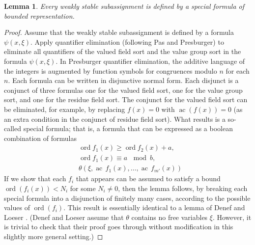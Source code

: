 \documentclass[11pt]{amsart}
\newtheorem{lemma}[theorem]{Lemma}
\theoremstyle{definition}
\theoremstyle{remark}
\numberwithin{equation}{theorem}
\def\op#1{\operatorname{#1}}
\begin{document}
\begin{lemma}  Every weakly stable subassignment is defined by a
special formula of bounded representation.
\end{lemma}

\begin{proof}  Assume that the weakly stable subassignment is
defined by a formula $\psi(x,\xi)$.  Apply quantifier elimination
(following Pas and Presburger) to eliminate all quantifiers of the
valued field sort and the value group sort in the formula
$\psi(x,\xi)$.  In Presburger quantifier elimination, the additive
language of the integers is augmented by function symbols for
congruences modulo $n$ for each $n$.  Each formula can be written
in disjunctive normal form.  Each disjunct is a conjunct of three
formulas one for the valued field sort, one for the value group
sort, and one for the residue field sort.   The conjunct for the
valued field sort can be eliminated, for example, by replacing
$f(x)=0$ with $\op{ac}(f(x))=0$ (as an extra condition in the
conjunct of residue field sort).  What results is a so-called
special formula; that is, a formula that can be expressed as a
boolean combination of formulas
    \begin{equation}
    \begin{array}{lll}
   &\op{ord} f_1(x) \ge \op{ord} f_2 (x) + a,\\
   &\op{ord} f_1(x) \equiv a \, \mod b,\\
   &\theta(\xi,\op{ac}\,f_1(x),\ldots,\op{ac}\,f_{m'}(x))
   \end{array}
    \end{equation}
If we show that each $f_i$ that appears can be assumed to satisfy
a bound $\op{ord}(f_i(x)) < N_i$ for some $N_i\ne0$, then the
lemma follows, by breaking each special formula into a disjunction
of finitely many cases, according to the possible values of
$\op{ord}(f_i)$.  This result is essentially identical to a lemma
of Denef and Loeser \cite[Lemma~2.8]{DLG}. (Denef and Loeser
assume that $\theta$ contains no free variables $\xi$. However, it
is trivial to check that their proof goes through without
modification in this slightly more general setting.)
\end{proof}
\end{document}
